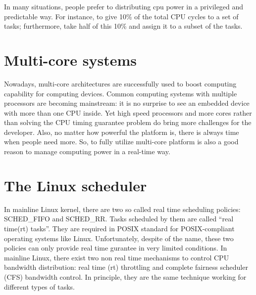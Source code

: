 %
%
% 

In many situations, people prefer to distributing cpu power in a
privileged and predictable way. For instance, to give 10\% of the
total CPU cycles to a set of tasks; furthermore, take half of this
10\% and assign it to a subset of the tasks.

\section{Multi-core systems}

Nowadays, multi-core architectures are successfully used to boost
computing capability for computing devices. Common computing systems
with multiple processors are becoming mainstream: it is no surprise to
see an embedded device with more than one CPU inside.  Yet high speed
processors and more cores rather than solving the CPU timing guarantee
problem do bring more challenges for the developer. Also, no matter
how powerful the platform is, there is always time when people need
more. So, to fully utilize multi-core platform is also a good reason
to manage computing power in a real-time way.
%
%


\section{The Linux scheduler}

%
%
In mainline Linux kernel, there are two so called real time scheduling
policies: SCHED\_FIFO and SCHED\_RR. Tasks scheduled by them are
called ``real time(rt) tasks''. They are required in POSIX standard
for POSIX-compliant operating systems like Linux. Unfortunately,
despite of the name, these two policies can only provide real time
gurantee in very limited conditions. In mainline Linux, there exist
two non real time mechanisms to control CPU bandwidth distribution:
real time (rt) throttling and complete fairness scheduler (CFS)
bandwidth control. In principle, they are the same technique working
for different types of tasks.


